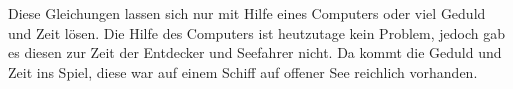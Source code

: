 \begin{refsection}
Diese Gleichungen lassen sich nur mit Hilfe eines Computers oder viel Geduld und Zeit lösen. Die Hilfe des Computers ist heutzutage kein Problem, jedoch gab es diesen zur Zeit der Entdecker und Seefahrer nicht. Da kommt die Geduld und Zeit ins Spiel, diese war auf einem Schiff auf offener See reichlich vorhanden.






\printbibliography[heading=subbibliography]
\end{refsection}







